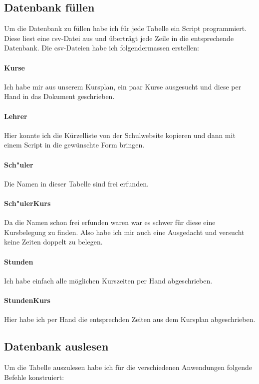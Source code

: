 \documentclass[a4paper, 12pt]{article}
\theoremstyle{plain}
\theoremstyle{definition}
\begin{document}
	\subsection{Datenbank füllen}
	Um die Datenbank zu füllen habe ich für jede Tabelle ein Script programmiert. Diese liest eine csv-Datei aus und überträgt jede Zeile in die entsprechende Datenbank. Die csv-Dateien habe ich folgendermassen erstellen:
	\paragraph{Kurse} Ich habe mir aus unserem Kursplan, ein paar Kurse ausgesucht und diese per Hand in das Dokument geschrieben.
	\paragraph{Lehrer} Hier konnte ich die Kürzelliste von der Schulwebsite kopieren und dann mit einem Script in die gewünschte Form bringen.
	\paragraph{Sch"uler} Die Namen in dieser Tabelle sind frei erfunden.
	\paragraph{Sch"ulerKurs} Da die Namen schon frei erfunden waren war es schwer für diese eine Kursbelegung zu finden. Also habe ich mir auch eine Ausgedacht und versucht keine Zeiten doppelt zu belegen.
	\paragraph{Stunden} Ich habe einfach alle möglichen Kurszeiten per Hand abgeschrieben.
	\paragraph{StundenKurs} Hier habe ich per Hand die entsprechden Zeiten aus dem Kursplan abgeschrieben.
	\subsection{Datenbank auslesen}
	Um die Tabelle auszulesen habe ich für die verschiedenen Anwendungen folgende Befehle konstruiert:
\end{document}
